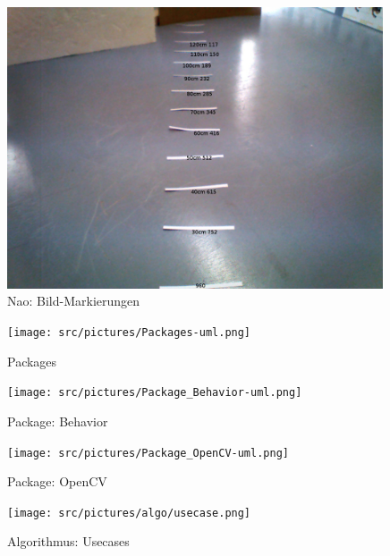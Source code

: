 \begin{appendix}
        \begin{figure}[ht]
            \centering
            \includegraphics[width=0.99\textwidth]{src/pictures/nao-marks.jpg}
            \caption{Nao: Bild-Markierungen}
            \label{img:marks}
        \end{figure}

        \cleardoubleemptypage

        \begin{figure}[ht]
            \centering
            \texttt{[image: src/pictures/Packages-uml.png]}
            \caption{Packages}
            \label{img:packages}
        \end{figure}

        \begin{figure}[ht]
            \centering
            \texttt{[image: src/pictures/Package\_Behavior-uml.png]}
            \caption{Package: Behavior}
            \label{img:package:behaviour}
        \end{figure}

        \begin{figure}[ht]
            \centering
            \texttt{[image: src/pictures/Package\_OpenCV-uml.png]}
            \caption{Package: OpenCV}
            \label{img:package:ocv}
        \end{figure}

        \cleardoubleemptypage

        \begin{figure}[ht]
            \centering
            \texttt{[image: src/pictures/algo/usecase.png]}
            \caption{Algorithmus: Usecases}
            \label{img:algo:usecases}
        \end{figure}


\end{appendix}
